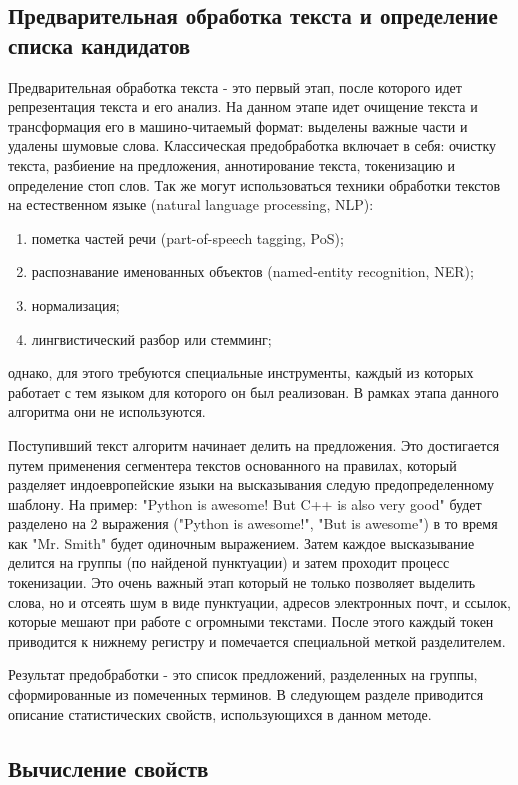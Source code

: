 \subsection{Предварительная обработка текста и определение списка кандидатов}
Предварительная обработка текста - это первый этап, после которого идет репрезентация текста и  его анализ.
На данном этапе идет очищение текста и трансформация его в машино-читаемый формат: выделены важные части и удалены шумовые слова.
Классическая предобработка включает в себя: очистку текста, разбиение на предложения, аннотирование текста, токенизацию и определение стоп слов.
Так же могут использоваться техники обработки текстов на естественном языке (natural language processing, NLP): 
\begin{enumerate}
	\item пометка частей речи (part-of-speech tagging, PoS);
	\item распознавание именованных объектов (named-entity recognition, NER);
	\item нормализация;
	\item лингвистический разбор или стемминг;
\end{enumerate}
однако, для этого требуются специальные инструменты, каждый из которых работает с тем языком для которого он был реализован.
В рамках этапа данного алгоритма они не используются.

Поступивший текст алгоритм начинает делить на предложения. 
Это достигается путем применения сегментера текстов основанного на правилах, который разделяет индоевропейские языки на высказывания следую предопределенному шаблону.
На пример: "Python is awesome! But C++ is also very good" будет разделено на 2 выражения ("Python is awesome!", "But is awesome") в то время как "Mr. Smith" будет одиночным выражением.
Затем каждое высказывание делится на группы (по найденой пунктуации) и затем проходит процесс токенизации.
Это очень важный этап который не только позволяет выделить слова, но и отсеять шум в виде пунктуации, адресов электронных почт, и ссылок, которые мешают при работе с огромными текстами.
После этого каждый токен приводится к нижнему регистру и помечается специальной меткой разделителем.

Результат предобработки - это список предложений, разделенных на группы, сформированные из помеченных терминов.
В следующем разделе приводится описание статистических свойств, использующихся в данном методе.

\subsection{Вычисление свойств}

